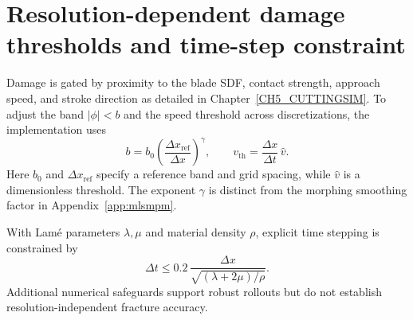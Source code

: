 \section{Resolution-dependent damage thresholds and time-step constraint}
\label{app:cut-resolution-cfl}

Damage is gated by proximity to the blade SDF, contact strength, approach speed, and stroke direction as detailed in Chapter~\ref{CH5_CUTTINGSIM}. To adjust the band $|\phi|<b$ and the speed threshold across discretizations, the implementation uses
\begin{equation}\label{eq:cut_resolution_scaling}
  b=b_0\left(\frac{\Delta x_{\mathrm{ref}}}{\Delta x}\right)^\gamma,
  \qquad
  v_{\mathrm{th}}=\frac{\Delta x}{\Delta t}\,\hat v.
\end{equation}
Here $b_0$ and $\Delta x_{\mathrm{ref}}$ specify a reference band and grid spacing, while $\hat v$ is a dimensionless threshold. The exponent $\gamma$ is distinct from the morphing smoothing factor in Appendix~\ref{app:mlsmpm}.

With Lam\'e parameters $\lambda,\mu$ and material density $\rho$, explicit time stepping is constrained by
\begin{equation}\label{eq:cut_cfl}
  \Delta t\le 0.2\,\frac{\Delta x}{\sqrt{(\lambda+2\mu)/\rho}}.
\end{equation}
Additional numerical safeguards support robust rollouts but do not establish resolution-independent fracture accuracy.

